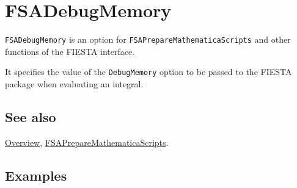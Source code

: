 \documentclass[../FeynHelpersManual.tex]{subfiles}
\begin{document}
\begin{Shaded}
\begin{Highlighting}[]
 
\end{Highlighting}
\end{Shaded}

\hypertarget{fsadebugmemory}{
\section{FSADebugMemory}\label{fsadebugmemory}}

\texttt{FSADebugMemory} is an option for
\texttt{FSAPrepareMathematicaScripts} and other functions of the FIESTA
interface.

It specifies the value of the \texttt{DebugMemory} option to be passed
to the FIESTA package when evaluating an integral.

\subsection{See also}

\hyperlink{toc}{Overview},
\hyperlink{fsapreparemathematicascripts}{FSAPrepareMathematicaScripts}.

\subsection{Examples}
\end{document}
